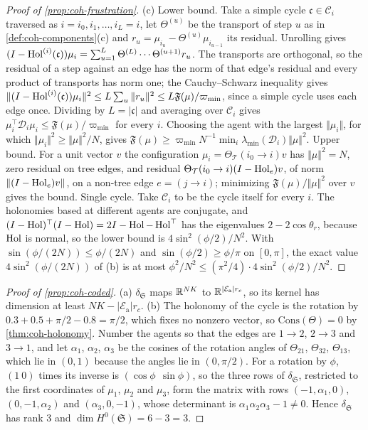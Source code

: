 \begin{proof}[Proof of \cref{prop:coh-frustration}]
(c) Lower bound. Take a simple cycle $\mathfrak c\in\mathcal C_i$ traversed as $i=i_0,i_1,\dots,i_L=i$, let $\Theta^{(u)}$ be the transport of step $u$ as in \cref{def:coh-components}(c) and $r_u=\mu_{i_u}-\Theta^{(u)}\mu_{i_{u-1}}$ its residual. Unrolling gives $(I-\operatorname{Hol}^{(i)}(\mathfrak c))\mu_i=\sum_{u=1}^L\Theta^{(L)}\cdots\Theta^{(u+1)}r_u$. The transports are orthogonal, so the residual of a step against an edge has the norm of that edge's residual and every product of transports has norm one; the Cauchy--Schwarz inequality gives $\Vert(I-\operatorname{Hol}^{(i)}(\mathfrak c))\mu_i\Vert^2\le L\sum_u\Vert r_u\Vert^2\le L\mathfrak F(\mu)/\varpi_{\min}$, since a simple cycle uses each edge once. Dividing by $L=|\mathfrak c|$ and averaging over $\mathcal C_i$ gives $\mu_i^\top\mathcal D_i\mu_i\le\mathfrak F(\mu)/\varpi_{\min}$ for every $i$. Choosing the agent with the largest $\Vert\mu_i\Vert$, for which $\Vert\mu_i\Vert^2\ge\Vert\mu\Vert^2/N$, gives $\mathfrak F(\mu)\ge\varpi_{\min}N^{-1}\min_i\lambda_{\min}(\mathcal D_i)\Vert\mu\Vert^2$. Upper bound. For a unit vector $v$ the configuration $\mu_i=\Theta_{\mathcal T}(i_0\to i)v$ has $\Vert\mu\Vert^2=N$, zero residual on tree edges, and residual $\Theta_{\mathcal T}(i_0\to i)(I-\operatorname{Hol}_e)v$, of norm $\Vert(I-\operatorname{Hol}_e)v\Vert$, on a non-tree edge $e=(j\to i)$; minimizing $\mathfrak F(\mu)/\Vert\mu\Vert^2$ over $v$ gives the bound. Single cycle. Take $\mathcal C_i$ to be the cycle itself for every $i$. The holonomies based at different agents are conjugate, and $(I-\operatorname{Hol})^\top(I-\operatorname{Hol})=2I-\operatorname{Hol}-\operatorname{Hol}^\top$ has the eigenvalues $2-2\cos\theta_r$, because $\operatorname{Hol}$ is normal, so the lower bound is $4\sin^2(\phi/2)/N^2$. With $\sin(\phi/(2N))\le\phi/(2N)$ and $\sin(\phi/2)\ge\phi/\pi$ on $[0,\pi]$, the exact value $4\sin^2(\phi/(2N))$ of (b) is at most $\phi^2/N^2\le(\pi^2/4)\cdot4\sin^2(\phi/2)/N^2$.
\end{proof}

\begin{proof}[Proof of \cref{prop:coh-coded}]
(a) $\delta_{\mathfrak S}$ maps $\mathbb{R}^{NK}$ to $\mathbb{R}^{|\mathcal E_{\mathrm a}|r_c}$, so its kernel has dimension at least $NK-|\mathcal E_{\mathrm a}|r_c$. (b) The holonomy of the cycle is the rotation by $0.3+0.5+\pi/2-0.8=\pi/2$, which fixes no nonzero vector, so $\mathrm{Cons}(\Theta)=0$ by \cref{thm:coh-holonomy}. Number the agents so that the edges are $1\to2$, $2\to3$ and $3\to1$, and let $\alpha_1$, $\alpha_2$, $\alpha_3$ be the cosines of the rotation angles of $\Theta_{21}$, $\Theta_{32}$, $\Theta_{13}$, which lie in $(0,1)$ because the angles lie in $(0,\pi/2)$. For a rotation by $\phi$, $(1\ 0)$ times its inverse is $(\cos\phi\ \ \sin\phi)$, so the three rows of $\delta_{\mathfrak S}$, restricted to the first coordinates of $\mu_1$, $\mu_2$ and $\mu_3$, form the matrix with rows $(-1,\alpha_1,0)$, $(0,-1,\alpha_2)$ and $(\alpha_3,0,-1)$, whose determinant is $\alpha_1\alpha_2\alpha_3-1\ne0$. Hence $\delta_{\mathfrak S}$ has rank $3$ and $\dim H^0(\mathfrak S)=6-3=3$.
\end{proof}

